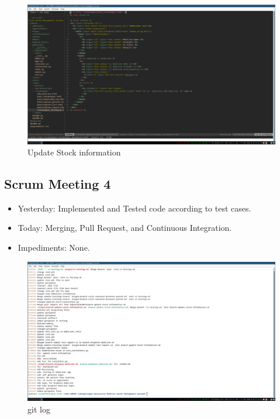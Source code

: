 \documentclass[a4paper,12pt]{article}
\begin{document}
\begin{figure}[H]
    \centering
    \includegraphics[width=1\textwidth]{images/meet33.png}   
    \caption{Update Stock information}
    \label{fig:meet33}
\end{figure}


\newpage
\subsection{Scrum Meeting 4}
\begin{itemize}
    \item Yesterday: Implemented and Tested code according to test cases.
    \item Today: Merging, Pull Request, and Continuous Integration.
    \item Impediments: None.
\end{itemize}
\begin{figure}[H]
    \centering
    \includegraphics[width=1\textwidth]{images/meet41.png}
    \caption{git log}
    \label{fig:meet41}
\end{figure}
\end{document}
